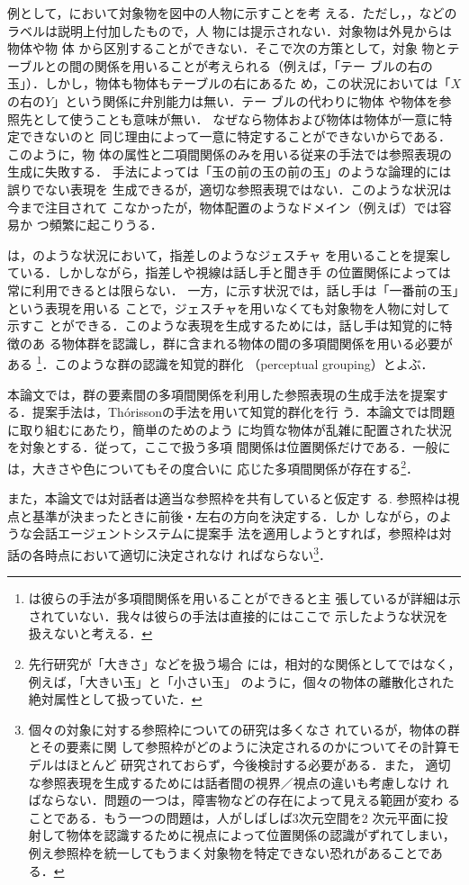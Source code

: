 \documentclass{nlp}
\begin{document}
例として，において対象物を図中の人物に示すことを考
える．ただし，，などのラベルは説明上付加したもので，人
物には提示されない．対象物は外見からは物体や物
体 から区別することができない．そこで次の方策として，対象
物とテーブルとの間の関係を用いることが考えられる（例えば，「テー
ブルの右の玉」）．しかし，物体も物体もテーブルの右にあるた
め，この状況においては「$X$の右の$Y$」という関係に弁別能力は無い．テー
ブルの代わりに物体 や物体を参照先として使うことも意味が無い．
なぜなら物体および物体は物体が一意に特定できないのと
同じ理由によって一意に特定することができないからである．このように，物
体の属性と二項間関係のみを用いる従来の手法では参照表現の生成に失敗する．
手法によっては「玉の前の玉の前の玉」のような論理的には誤りでない表現を
生成できるが，適切な参照表現ではない．このような状況は今まで注目されて
こなかったが，物体配置のようなドメイン（例えば\cite{TH2004}）では容易か
つ頻繁に起こりうる．

\cite{IV2000}は，のような状況において，指差しのようなジェスチャ
を用いることを提案している．しかしながら，指差しや視線は話し手と聞き手
の位置関係によっては常に利用できるとは限らない．
一方，に示す状況では，話し手は「一番前の玉」という表現を用いる
ことで，ジェスチャを用いなくても対象物を人物に対して示すこ
とができる．このような表現を生成するためには，話し手は知覚的に特徴のあ
る物体群を認識し，群に含まれる物体の間の多項間関係を用いる必要がある
\footnote{\cite{EK2003}は彼らの手法が多項間関係を用いることができると主
  張しているが詳細は示されていない．我々は彼らの手法は直接的にはここで
  示したような状況を扱えないと考える．}．このような群の認識を知覚的群化
（perceptual grouping）とよぶ．

本論文では，群の要素間の多項間関係を利用した参照表現の生成手法を提案す
る．提案手法は，Th\'{o}rissonの手法\cite{KT1994}を用いて知覚的群化を行
う．本論文では問題に取り組むにあたり，簡単のためのよう
に均質な物体が乱雑に配置された状況を対象とする．従って，ここで扱う多項
間関係は位置関係だけである．一般には，大きさや色についてもその度合いに
応じた多項間関係が存在する\footnote{先行研究が「大きさ」などを扱う場合
  には，相対的な関係としてではなく，例えば，「大きい玉」と「小さい玉」
  のように，個々の物体の離散化された絶対属性として扱っていた．}．

また，本論文では対話者は適当な参照枠\cite{SL2003}を共有していると仮定す
る. 参照枠は視点と基準が決まったときに前後・左右の方向を決定する．しか
しながら，\cite{MC2002,TH2004}のような会話エージェントシステムに提案手
法を適用しようとすれば，参照枠は対話の各時点において適切に決定されなけ
ればならない\footnote{個々の対象に対する参照枠についての研究は多くなさ
  れているが\cite{HC1973,AH1986,JW2002,SL2003}，物体の群とその要素に関
  して参照枠がどのように決定されるのかについてその計算モデルはほとんど
  研究されておらず，今後検討する必要がある．また，
  適切な参照表現を生成するためには話者間の視界／視点の違いも考慮しなけ
  ればならない．問題の一つは，障害物などの存在によって見える範囲が変わ
  ることである．もう一つの問題は，人がしばしば3次元空間を2 次元平面に投
  射して物体を認識するために視点によって位置関係の認識がずれてしまい，
  例え参照枠を統一してもうまく対象物を特定できない恐れがあることであ
  る．}．
\end{document}
